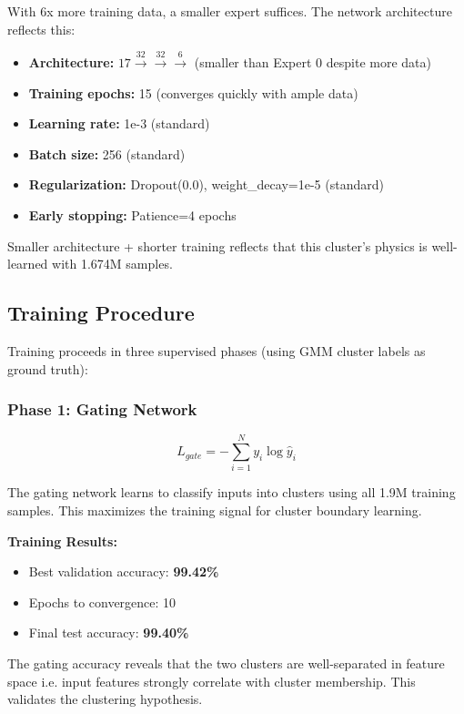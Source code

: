 \documentclass[letterpaper,twocolumn,10pt]{article}
\begin{document}
With 6x more training data, a smaller expert suffices. The network architecture reflects this:
\begin{itemize}
    \item \textbf{Architecture:} $17 \xrightarrow{32} \xrightarrow{32} \xrightarrow{6}$ (smaller than Expert 0 despite more data)
    \item \textbf{Training epochs:} 15 (converges quickly with ample data)
    \item \textbf{Learning rate:} 1e-3 (standard)
    \item \textbf{Batch size:} 256 (standard)
    \item \textbf{Regularization:} Dropout(0.0), weight\_decay=1e-5 (standard)  
    \item \textbf{Early stopping:} Patience=4 epochs
\end{itemize}

Smaller architecture + shorter training reflects that this cluster's physics is well-learned with 1.674M samples.

\subsection{Training Procedure}

Training proceeds in three supervised phases (using GMM cluster labels as ground truth):

\subsubsection{Phase 1: Gating Network}

\begin{equation}
L_{gate} = -\sum_{i=1}^{N} y_i \log \hat{y}_i
\end{equation}

The gating network learns to classify inputs into clusters using all 1.9M training samples. This maximizes the training signal for cluster boundary learning.

\textbf{Training Results:}
\begin{itemize}
    \item Best validation accuracy: \textbf{99.42\%}
    \item Epochs to convergence: 10
    \item Final test accuracy: \textbf{99.40\%}
\end{itemize}

The gating accuracy reveals that the two clusters are well-separated in feature space i.e. input features strongly correlate with cluster membership. This validates the clustering hypothesis.
\end{document}
